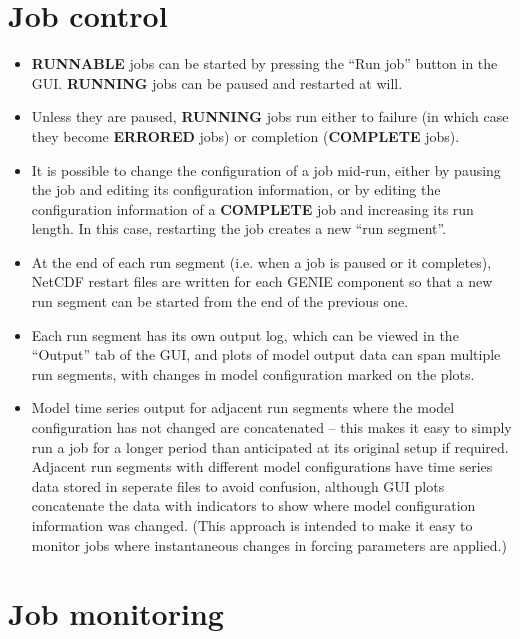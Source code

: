 \documentclass[a4paper,11pt,article]{memoir}
\begin{document}
\section{Job control}

\begin{itemize}
  \item{\textbf{RUNNABLE} jobs can be started by pressing the ``Run
    job'' button in the GUI.  \textbf{RUNNING} jobs can be paused and
    restarted at will.}
  \item{Unless they are paused, \textbf{RUNNING} jobs run either to
    failure (in which case they become \textbf{ERRORED} jobs) or
    completion (\textbf{COMPLETE} jobs).}
  \item{It is possible to change the configuration of a job mid-run,
    either by pausing the job and editing its configuration
    information, or by editing the configuration information of a
    \textbf{COMPLETE} job and increasing its run length.  In this
    case, restarting the job creates a new ``run segment''.}
  \item{At the end of each run segment (i.e. when a job is paused or
    it completes), NetCDF restart files are written for each GENIE
    component so that a new run segment can be started from the end of
    the previous one.}
  \item{Each run segment has its own output log, which can be viewed
    in the ``Output'' tab of the GUI, and plots of model output data
    can span multiple run segments, with changes in model
    configuration marked on the plots.}
  \item{Model time series output for adjacent run segments where the
    model configuration has not changed are concatenated -- this makes
    it easy to simply run a job for a longer period than anticipated
    at its original setup if required.  Adjacent run segments with
    different model configurations have time series data stored in
    seperate files to avoid confusion, although GUI plots concatenate
    the data with indicators to show where model configuration
    information was changed.  (This approach is intended to make it
    easy to monitor jobs where instantaneous changes in forcing
    parameters are applied.)}
\end{itemize}

\section{Job monitoring}
\end{document}
